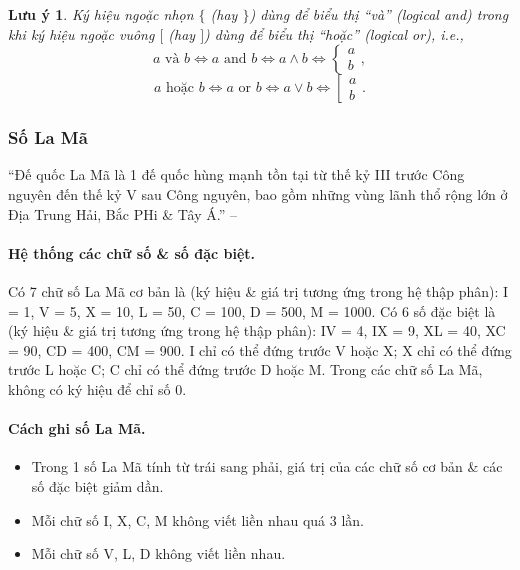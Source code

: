 \documentclass{article}
\numberwithin{equation}{section}
\newtheorem{remark}{Lưu ý}[section]
\begin{document}
\begin{remark}
	Ký hiệu ngoặc nhọn $\{$ (hay $\}$) dùng để biểu thị ``và'' (logical and) trong khi ký hiệu ngoặc vuông $[$ (hay $]$) dùng để biểu thị ``hoặc'' (logical or), i.e.,
	\begin{equation*}
		a\mbox{ và } b\Leftrightarrow a\mbox{ and } b\Leftrightarrow a\land b\Leftrightarrow\left\{\begin{split}
			a\\b
		\end{split}\right.,	
	\end{equation*}
	\begin{equation*}
		a\mbox{ hoặc } b\Leftrightarrow a\mbox{ or } b\Leftrightarrow a\lor b\Leftrightarrow\left[\begin{split}
			a\\b
		\end{split}\right..
	\end{equation*}
\end{remark}

\subsubsection{Số La Mã}
``Đế quốc La Mã là 1 đế quốc hùng mạnh tồn tại từ thế kỷ III trước Công nguyên đến thế kỷ V sau Công nguyên, bao gồm những vùng lãnh thổ rộng lớn ở Địa Trung Hải, Bắc PHi \& Tây Á.'' -- \cite[p. 14]{Thai_Anh_Dat_Ha_Loan_Nam_Quang_Toan_6_tap_1}

\paragraph{Hệ thống các chữ số \& số đặc biệt.} Có 7 chữ số La Mã cơ bản là (ký hiệu \& giá trị tương ứng trong hệ thập phân): I = 1, V = 5, X = 10, L = 50, C = 100, D = 500, M = 1000. Có 6 số đặc biệt là (ký hiệu \& giá trị tương ứng trong hệ thập phân): IV = 4, IX = 9, XL = 40, XC = 90, CD = 400, CM = 900. I chỉ có thể đứng trước V hoặc X; X chỉ có thể đứng trước L hoặc C; C chỉ có thể đứng trước D hoặc M. Trong các chữ số La Mã, không có ký hiệu để chỉ số 0.

\paragraph{Cách ghi số La Mã.}
\begin{itemize}
	\item Trong 1 số La Mã tính từ trái sang phải, giá trị của các chữ số cơ bản \& các số đặc biệt giảm dần.
	\item Mỗi chữ số I, X, C, M không viết liền nhau quá 3 lần.
	\item Mỗi chữ số V, L, D không viết liền nhau.
\end{itemize}
\end{document}
